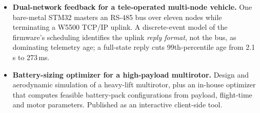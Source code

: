 \documentclass[a4paper,20pt]{article}
\begin{document}
\begin{itemize}[leftmargin=*, itemsep=3.5pt, parsep=0pt, topsep=3pt]
    \item \textbf{Dual-network feedback for a tele-operated multi-node vehicle.} One bare-metal STM32 masters an RS-485 bus over eleven nodes while terminating a W5500 TCP/IP uplink. A discrete-event model of the firmware's scheduling identifies the uplink \emph{reply format}, not the bus, as dominating telemetry age; a full-state reply cuts 99th-percentile age from 2.1\,s to 273\,ms. \vspace{-5pt}

    \item \textbf{Battery-sizing optimizer for a high-payload multirotor.} Design and aerodynamic simulation of a heavy-lift multirotor, plus an in-house optimizer that computes feasible battery-pack configurations from payload, flight-time and motor parameters. Published as an interactive client-side tool. \vspace{-5pt}

\end{itemize}
\end{document}
